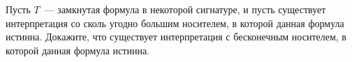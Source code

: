 Пусть $T$~--- замкнутая формула в некоторой сигнатуре, и пусть существует интерпретация со сколь угодно большим носителем, в которой
данная формула истинна. Докажите, что существует интерпретация с бесконечным носителем, в которой данная формула истинна.